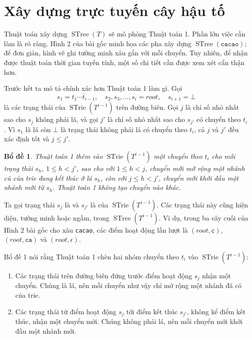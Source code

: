 \documentclass[11pt]{article}
\newtheorem{lemma}{Bổ đề}
\newcommand{\eps}{\epsilon}
\newcommand{\STrie}{\operatorname{STrie}}
\newcommand{\STree}{\operatorname{STree}}
\begin{document}
\section{Xây dựng trực tuyến cây hậu tố}

Thuật toán xây dựng $\STree(T)$ sẽ mô phỏng Thuật toán 1. Phần lớn việc cần
làm là rõ ràng. Hình 2 của bài gốc minh họa các pha xây dựng
$\STree(\texttt{cacao})$; để đơn giản, hình vẽ ghi tường minh xâu gắn với mỗi
chuyển. Tuy nhiên, để nhận được thuật toán thời gian tuyến tính, một số chi
tiết cần được xem xét cẩn thận hơn.

Trước hết ta mô tả chính xác hơn Thuật toán 1 làm gì. Gọi
\[
  s_1=\overline{t_1\cdots t_{i-1}},\quad s_2,s_3,\ldots,s_i=\mathit{root},
  \quad s_{i+1}=\bot
\]
là các trạng thái của $\STrie(T^{i-1})$ trên đường biên. Gọi $j$ là chỉ số nhỏ
nhất sao cho $s_j$ không phải lá, và gọi $j'$ là chỉ số nhỏ nhất sao cho
$s_{j'}$ có chuyển theo $t_i$. Vì $s_1$ là lá còn $\bot$ là trạng thái không
phải lá có chuyển theo $t_i$, cả $j$ và $j'$ đều xác định tốt và $j\le j'$.

\begin{lemma}
Thuật toán 1 thêm vào $\STrie(T^{i-1})$ một chuyển theo $t_i$ cho mỗi trạng
thái $s_h$, $1\le h<j'$, sao cho với $1\le h<j$, chuyển mới mở rộng một nhánh
cũ của trie đang kết thúc ở lá $s_h$, còn với $j\le h<j'$, chuyển mới khởi đầu
một nhánh mới từ $s_h$. Thuật toán 1 không tạo chuyển nào khác.
\end{lemma}

Ta gọi trạng thái $s_j$ là  và $s_{j'}$ là
 của $\STrie(T^{i-1})$. Các trạng thái này cũng hiện diện,
tường minh hoặc ngầm, trong $\STree(T^{i-1})$. Ví dụ, trong ba cây cuối của
Hình 2 bài gốc cho xâu \texttt{cacao}, các điểm hoạt động lần lượt là
$(\mathit{root},\texttt{c})$, $(\mathit{root},\texttt{ca})$ và
$(\mathit{root},\eps)$.

Bổ đề 1 nói rằng Thuật toán 1 chèn hai nhóm chuyển theo $t_i$ vào
$\STrie(T^{i-1})$:
\begin{enumerate}
  \item Các trạng thái trên đường biên đứng trước điểm hoạt động $s_j$ nhận
  một chuyển. Chúng là lá, nên mỗi chuyển như vậy chỉ mở rộng một nhánh đã có
  của trie.
  \item Các trạng thái từ điểm hoạt động $s_j$ tới điểm kết thúc $s_{j'}$,
  không kể điểm kết thúc, nhận một chuyển mới. Chúng không phải lá, nên mỗi
  chuyển mới khởi đầu một nhánh mới.
\end{enumerate}
\end{document}
